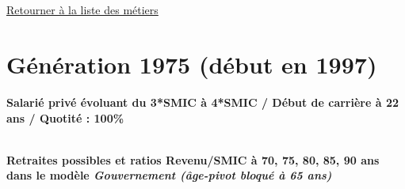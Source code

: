 ~\\ 
 


   
 \localtableofcontents 

~\\ 
 
 \hyperlink{page.2}{\noindent Retourner à la liste des métiers}

 \newpage 

\section{Génération 1975 (début en 1997)\label{Ascendant34_100_1975_22_0}} 
 
{\bf \noindent Salarié privé évoluant du 3*SMIC à 4*SMIC / Début de carrière à 22 ans / Quotité : 100\%}  ~ 

 ~\\{\bf \noindent Retraites possibles et ratios Revenu/SMIC à 70, 75, 80, 85, 90 ans dans le modèle \emph{Gouvernement (âge-pivot bloqué à 65 ans)}}  
 
